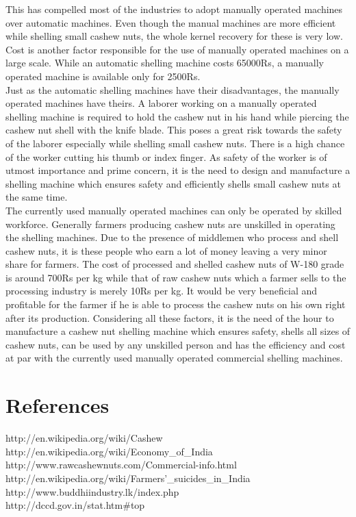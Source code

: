 \documentclass [12pt] {report}
\begin{document}
This has compelled most of the industries to adopt manually operated machines over automatic machines. Even though the manual machines are more efficient while shelling small cashew nuts, the whole kernel recovery for these is very low.\\Cost is another factor responsible for the use of manually operated machines on a large scale. While an automatic shelling machine costs 65000Rs,  a manually operated machine is available only for 2500Rs.\\Just as the automatic shelling machines have their disadvantages, the manually operated machines have theirs. A laborer working on a manually operated shelling machine is required to hold the cashew nut in his hand while piercing the cashew nut shell with the knife blade. This poses a great risk towards the safety of the laborer especially while shelling small cashew nuts. There is a high chance of the worker cutting his thumb or index finger. As safety of the worker is of utmost importance and prime concern, it is the need to design and manufacture a shelling machine which ensures safety and efficiently shells small cashew nuts at the same time.\\The currently used manually operated machines can only be operated by skilled workforce. Generally farmers producing cashew nuts are unskilled in operating the shelling machines. Due to the presence of middlemen who process and shell cashew nuts, it is these people who earn a lot of money leaving a very minor share for farmers. The cost of processed and shelled cashew nuts of W-180 grade is around 700Rs per kg while that of raw cashew nuts which a farmer sells to the processing industry is merely 10Rs per kg. It would be very beneficial and profitable for the farmer if he is able to process the cashew nuts on his own right after its production. Considering all these factors, it is the need of the hour to manufacture a cashew nut shelling machine which ensures safety, shells all sizes of cashew nuts, can be used by any unskilled person and has the efficiency and cost at par with the currently used manually operated commercial shelling machines.

\section{References}
http://en.wikipedia.org/wiki/Cashew\\
http://en.wikipedia.org/wiki/Economy\_of\_India\\
http://www.rawcashewnuts.com/Commercial-info.html\\
http://en.wikipedia.org/wiki/Farmers'\_suicides\_in\_India\\
http://www.buddhiindustry.lk/index.php\\
http://dccd.gov.in/stat.htm\#top\\
\end{document}
